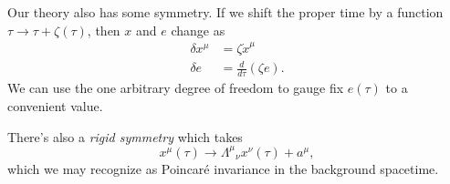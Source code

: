 \begin{exm}
    Our theory also has some symmetry. If we shift the proper time by a function $\tau\to \tau+\zeta(\tau)$, then $x$ and $e$ change as 
    \begin{align*}
        \delta x^\mu &= \zeta \dot x^\mu\\
        \delta e &= \frac{d}{d\tau}(\zeta e).
    \end{align*}
    We can use the one arbitrary degree of freedom to gauge fix $e(\tau)$ to a convenient value.
    
    There's also a \emph{rigid symmetry} which takes
    \begin{equation*}
        x^\mu(\tau)\to \Lambda^\mu{}_\nu x^\nu(\tau)+a^\mu,
    \end{equation*}
    which we may recognize as Poincar\'e invariance in the background spacetime.
\end{exm}